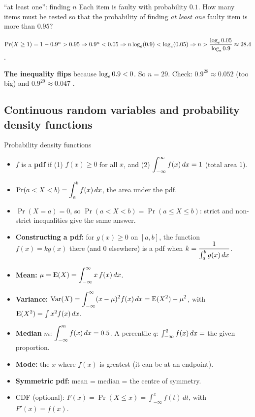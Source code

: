 \begin{example}{``at least one'': finding $n$}
Each item is faulty with probability $0.1$. How many items must be tested so that the probability of finding \emph{at least one} faulty item is more than $0.95$?\par
$\Pr(X\ge1)=1-0.9^n>0.95\Rightarrow0.9^n<0.05\Rightarrow n\log_e(0.9)<\log_e(0.05)\Rightarrow n>\dfrac{\log_e0.05}{\log_e0.9}\approx28.4$.\par
\textbf{The inequality flips} because $\log_e0.9<0$. So $n=29$. Check: $0.9^{28}\approx0.052$ (too big) and $0.9^{29}\approx0.047$ \tick.
\end{example}

\subsection{Continuous random variables and probability density functions}
\label{sec:crv}

\begin{keyres}{Probability density functions}
\begin{cols}
\begin{itemize}
  \item $f$ is a \textbf{pdf} if (1) $f(x)\ge0$ for all $x$, and (2) $\displaystyle\int_{-\infty}^{\infty}f(x)\,dx=1$ (total area $1$).
  \item $\Pr(a<X<b)=\displaystyle\int_a^bf(x)\,dx$, the area under the pdf.
  \item $\Pr(X=a)=0$, so $\Pr(a<X<b)=\Pr(a\le X\le b)$: strict and non-strict inequalities give the same answer.
  \item \textbf{Constructing a pdf:} for $g(x)\ge0$ on $[a,b]$, the function $f(x)=kg(x)$ there (and $0$ elsewhere) is a pdf when $k=\dfrac{1}{\int_a^bg(x)\,dx}$.
\end{itemize}
\nextcol
\begin{itemize}
  \item \textbf{Mean:} $\mu=\mathrm{E}(X)=\displaystyle\int_{-\infty}^{\infty}x\,f(x)\,dx$.
  \item \textbf{Variance:} $\mathrm{Var}(X)=\displaystyle\int_{-\infty}^{\infty}(x-\mu)^2f(x)\,dx=\mathrm{E}(X^2)-\mu^2$, with $\mathrm{E}(X^2)=\int x^2f(x)\,dx$.
  \item \textbf{Median} $m$: $\displaystyle\int_{-\infty}^{m}f(x)\,dx=0.5$. A percentile $q$: $\int_{-\infty}^qf(x)\,dx=$ the given proportion.
  \item \textbf{Mode:} the $x$ where $f(x)$ is greatest (it can be at an endpoint).
  \item \textbf{Symmetric pdf:} mean = median = the centre of symmetry.
  \item CDF (optional): $F(x)=\Pr(X\le x)=\int_{-\infty}^xf(t)\,dt$, with $F'(x)=f(x)$.
\end{itemize}
\end{cols}
\end{keyres}

